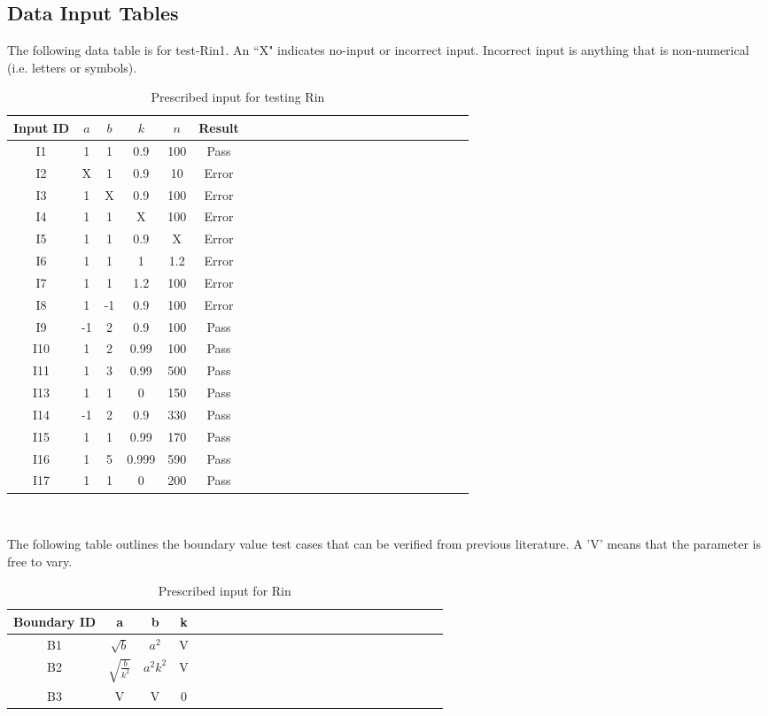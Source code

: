 \documentclass[12pt, titlepage]{article}
\begin{document}
\newpage
\subsection{Data Input Tables} 
\label{datainput}
The following data table is for test-Rin1. An ``X" indicates no-input or 
incorrect input. Incorrect input is anything that is non-numerical (i.e. 
letters 
or symbols). 

\begin{table}[h!]
	\centering
	\begin{tabular}{|c|c|c|c|c|c|c|c|c|c|c|c|c|c|c|c|c|c|c|c|c|c|c|c|}
		\hline        
		Input ID& $a$ & $b$ & $k$ & $n$ & Result \\
		\hline
		I1     &1 &1 &0.9 &100 & Pass \\ \hline
		I2    &X &1 &0.9 &10 & Error \\ \hline
		I3    &1 &X &0.9 &100 & Error\\ \hline 
		I4    &1 &1 &X &100 &Error \\ \hline 
		I5     &1 &1 &0.9 &X &Error \\ \hline
		I6    &1 &1 &1 & 1.2& Error\\ \hline
		I7    &1 &1 &1.2 & 100&Error\\ \hline 
		I8    &1 &-1 &0.9 &100& Error \\ \hline
		I9     &-1 &2 &0.9 &100 & Pass \\ \hline
		I10    &1 &2 &0.99 &100 & Pass\\ \hline
		I11    &1 &3 &0.99 &500 & Pass \\ \hline 
		I13   &1 &1 &0 &150 & Pass  \\ \hline
		I14     &-1 &2 &0.9 &330 & Pass \\ \hline
		I15    &1 &1 &0.99 &170 & Pass\\ \hline
		I16    &1 &5 &0.999 &590 & Pass \\ \hline 
		I17   &1 &1 &0 &200 & Pass  \\ 
		\hline
	\end{tabular}\\
	\caption{Prescribed input for testing Rin}
	\label{Table:D_11}
\end{table} 

The following table outlines the boundary value test cases that can be verified 
from previous literature. A 'V' means that the parameter is free to vary.
\begin{table}[h!]
	\centering
	\begin{tabular}{|c|c|c|c|c|c|c|c|c|c|c|c|c|c|c|c|c|c|c|c|c|c|c|c|}
		\hline        
		Boundary ID& a& b& k  \\
		\hline
		B1     &$\sqrt{b}$ &$a^{2}$ &V    \\ \hline
		B2    &$\sqrt{\frac{b}{k^{2}}}$ &$a^{2}k^{2}$ &V   \\ \hline
		B3    &V &V &0  \\ 
		\hline
	\end{tabular}\\
	\caption{Prescribed input for Rin}
	\label{Table:D_22}
\end{table} 
\end{document}
